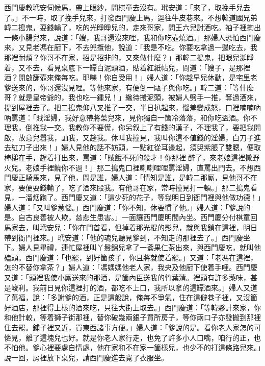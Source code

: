 西門慶教玳安伺候馬，帶上眼紗，問棋童去沒有。玳安道：「來了，取挽手兒去了。」不一時，取了挽手兒來，打發西門慶上馬，逕往牛皮巷來。不想韓道國兄弟韓二搗鬼，耍錢輸了，吃的光睜睜兒的，走來哥家，問王六兒討酒吃。袖子裡掏出一條小腸兒來，說道：「嫂，我哥還沒來哩，我和你吃壺燒酒。」那婦人恐怕西門慶來，又見老馮在廚下，不去兜攬他，說道：「我是不吃。你要吃拿過一邊吃去，我那裡耐煩？你哥不在家，招是招非的，又來做什麼？」那韓二搗鬼，把眼兒涎睜着，又不去，看見桌底下一罈白泥頭酒，貼着紅紙帖兒，問道：「嫂子，是那裡酒？開啟篩壺來俺每吃。耶嚛！你自受用！」婦人道：「你趁早兒休動，是宅里老爹送來的，你哥還沒見哩。等他來家，有便倒一甌子與你吃。」韓二道：「等什麼哥？就是皇帝爺的，我也吃一鍾兒！」纔待搬泥頭，被婦人劈手一推，奪過酒來，提到屋裡去了。把二搗鬼仰八叉推了一交，半日扒起來，惱羞變成怒，口裡喃喃吶吶罵道：「賊淫婦，我好意帶將菜兒來，見你獨自一箇冷落落，和你吃盃酒。你不理我，倒推我一交。我教你不要慌，你另叙上了有錢的漢子，不理我了，要把我開啟，故意兒囂我，訕我，又趍我。休叫我撞見，我叫你這不値錢的淫婦，白刀子進去紅刀子出來！」婦人見他的話不妨頭，一點紅從耳邊起，須臾紫脹了雙腮，便取棒槌在手，趕着打出來，{}罵道：「賊餓不死的殺才！你那裡𠳹醉了，來老娘這裡撒野火兒。老娘手裡饒你不過！」那二搗鬼口裡喇喇哩哩罵淫婦，直罵出門去。不想西門慶正騎馬來，見了他，問是誰，婦人道：「情知是誰，是韓二那厮，見他哥不在家，要便耍錢輸了，吃了酒來毆我。有他哥在家，常時撞見打一頓。」那二搗鬼看見，一溜烟跑了。西門慶又道：「這少死的花子，等我明日到衙門裡與他做功德！」婦人道：「又叫爹惹惱。」西門慶道：「你不知，休要慣了他。」婦人道：「爹說的是。自古良善被人欺，慈悲生患害。」一面讓西門慶明間內坐。西門慶分付棋童回馬家去，叫玳安兒：「你在門首看，但掉着那光棍的影兒，就與我鎖在這裡，明日帶到衙門裡來。」玳安道：「他的魂兒聽見爹到，不知走的那裡去了。」西門慶坐下。婦人見畢禮，連忙屋裡叫丫鬟錦兒拿了一盞果仁茶出來，與西門慶吃，就叫他磕頭。西門慶道：「也罷，到好箇孩子，你且將就使着罷。」又道：「老馮在這裡，怎的不替你拿茶？」婦人道：「馮媽媽他老人家，我央及他廚下使着手哩。西門慶又道：「頭裡我使小厮送來的那酒，是箇內臣送我的竹葉清。裡頭有許多藥味，甚是峻利。我前日見你這裡打的酒，都吃不上口，我所以拿的這罈酒來。」婦人又道了萬福，說：「多謝爹的酒，正是這般說，俺每不爭氣，住在這僻巷子裡，又沒箇好酒店，那裡得上樣的酒來吃，只往大街上取去。」西門慶道：「等韓夥計來家，你和他計較，等着獅子街那裡，替你破幾兩銀子買所房子，等你兩口子亦發搬到那裡住去罷。鋪子裡又近，買東西諸事方便。」婦人道：「爹說的是。看你老人家怎的可憐見，離了這塊兒也好。就是你老人家行走，也免了許多小人口嘴，咱行的正，也不怕他。{}爹心裡要處自情處，他在家和不在家一箇樣兒，也少不的打這條路兒來。」{}說一回，房裡放下桌兒，請西門慶進去寬了衣服坐。

